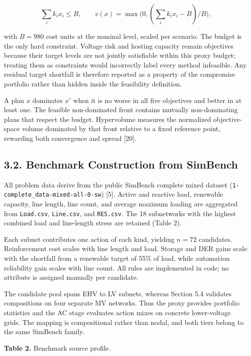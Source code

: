 \documentclass[
  10pt,
  a4paper,
]{article}
\begin{document}
\[
\textstyle\sum_i k_i x_i \le B, \qquad v(x) = \max\big(0, (\textstyle\sum_i k_i x_i - B)/B\big),
\]

with \(B = 980\) cost units at the nominal level, scaled per scenario.
The budget is the only hard constraint. Voltage risk and hosting
capacity remain objectives because their target levels are not jointly
satisfiable within this proxy budget; treating them as constraints would
incorrectly label every method infeasible. Any residual target shortfall
is therefore reported as a property of the compromise portfolio rather
than hidden inside the feasibility definition.

A plan \(x\) dominates \(x'\) when it is no worse in all five objectives
and better in at least one. The feasible non-dominated front contains
mutually non-dominating plans that respect the budget. Hypervolume
measures the normalized objective-space volume dominated by that front
relative to a fixed reference point, rewarding both convergence and
spread {[}20{]}.

\subsection{3.2. Benchmark Construction from
SimBench}\label{benchmark-construction-from-simbench}

All problem data derive from the public SimBench complete mixed dataset
(\texttt{1-complete\_data-mixed-all-0-sw}) {[}5{]}. Active and reactive
load, renewable capacity, line length, line count, and average maximum
loading are aggregated from \texttt{Load.csv}, \texttt{Line.csv}, and
\texttt{RES.csv}. The 18 subnetworks with the highest combined load and
line-length stress are retained (Table 2).

Each subnet contributes one action of each kind, yielding \(n=72\)
candidates. Reinforcement cost scales with line length and load. Storage
and DER gains scale with the shortfall from a renewable target of 55\%
of load, while automation reliability gain scales with line count. All
rules are implemented in code; no attribute is assigned manually per
candidate.

The candidate pool spans EHV to LV subnets, whereas Section 5.4
validates compositions on four separate MV networks. Thus the proxy
provides portfolio statistics and the AC stage evaluates action mixes on
concrete lower-voltage grids. The mapping is compositional rather than
nodal, and both tiers belong to the same SimBench family.

\textbf{Table 2.} Benchmark source profile.
\end{document}
